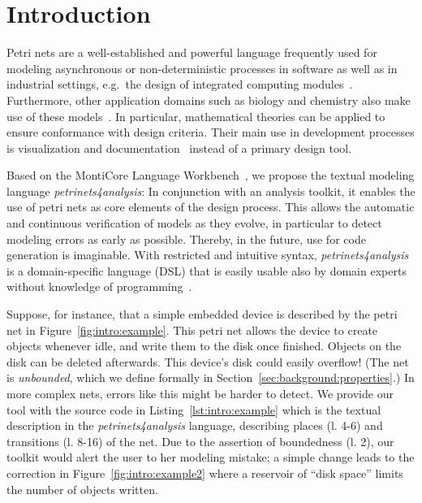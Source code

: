 
\section{Introduction}


Petri nets are a well-established and powerful language frequently used for modeling asynchronous or non-deterministic processes in software as well as in industrial settings, e.g.\ the design of integrated computing modules~\cite{yakovlev1996petri}. Furthermore, other application domains such as biology and chemistry also make use of these models~\cite{chaouiya2007petri}. In particular, mathematical theories can be applied to ensure conformance with design criteria. Their main use in development processes is visualization and documentation~\cite{schindler2012werkzeuginfrastruktur}\cite[p.~79]{zimmermann2007stochastic} instead of a primary design tool.

Based on the MontiCore Language Workbench~\cite{rumpe2017monticore}, we propose the textual modeling language \emph{petrinets4analysis}: In conjunction with an analysis toolkit, it enables the use of petri nets as core elements of the design process. This allows the automatic and continuous verification of models as they evolve, in particular to detect modeling errors as early as possible. Thereby, in the future, use for code generation is imaginable. With restricted and intuitive syntax, \emph{petrinets4analysis} is a domain-specific language (DSL) that is easily usable also by domain experts without knowledge of programming~\cite{karsai2014design}.

Suppose, for instance, that a simple embedded device is described by the petri net in Figure~\ref{fig:intro:example}. This petri net allows the device to create objects whenever idle, and write them to the disk once finished. Objects on the disk can be deleted afterwards. This device's disk could easily overflow! (The net is \emph{unbounded}, which we define formally in Section~\ref{sec:background:properties}.) In more complex nets, errors like this might be harder to detect. We provide our tool with the source code in Listing~\ref{lst:intro:example} which is the textual description in the \emph{petrinets4analysis} language, describing places (l. 4-6) and transitions (l. 8-16) of the net. Due to the assertion of boundedness (l. 2), our toolkit would alert the user to her modeling mistake; a simple change leads to the correction in Figure~\ref{fig:intro:example2} where a reservoir of ``disk space'' limits the number of objects written.

